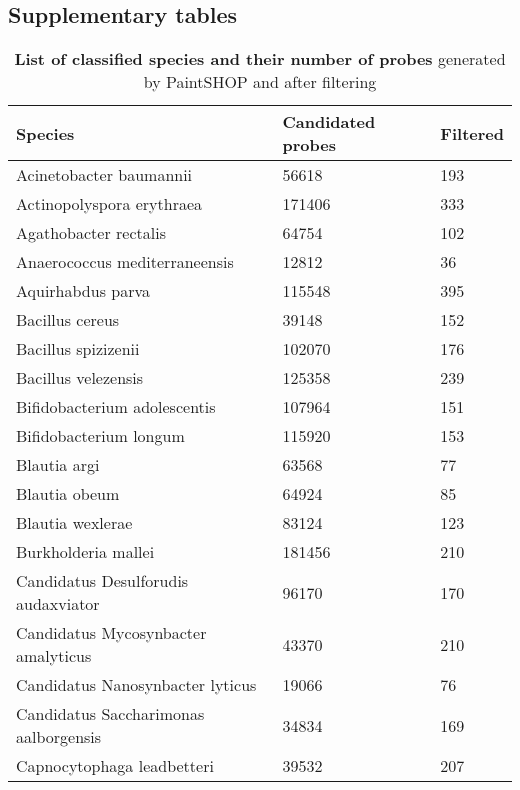 \documentclass[10pt,letterpaper]{article}
\newcommand{\beginsupplement}{%
        \setcounter{table}{0}
        \renewcommand{\thetable}{S\arabic{table}}%
        \setcounter{figure}{0}
        \renewcommand{\thefigure}{S\arabic{figure}}%
     }
\begin{document}
\subsection*{Supplementary tables}
\beginsupplement{
\begin{longtable}
{| p{} | p{} | p{} |} 
\caption{\textbf{List of classified species and their number of probes} generated by PaintSHOP and after filtering} %
\label{tableS1}
\hline
\textbf{Species}                               & \textbf{Candidated probes}      & \textbf{Filtered}   \\ \hline
Acinetobacter baumannii               & 56618  & 193 \\ \hline
Actinopolyspora erythraea             & 171406 & 333 \\ \hline
Agathobacter rectalis                 & 64754  & 102 \\ \hline
Anaerococcus mediterraneensis         & 12812  & 36  \\ \hline
Aquirhabdus parva                     & 115548 & 395 \\ \hline
Bacillus cereus                       & 39148  & 152 \\ \hline
Bacillus spizizenii                   & 102070 & 176 \\ \hline
Bacillus velezensis                   & 125358 & 239 \\ \hline
Bifidobacterium adolescentis          & 107964 & 151 \\ \hline
Bifidobacterium longum                & 115920 & 153 \\ \hline
Blautia argi                          & 63568  & 77  \\ \hline
Blautia obeum                         & 64924  & 85  \\ \hline
Blautia wexlerae                      & 83124  & 123 \\ \hline
Burkholderia mallei                   & 181456 & 210 \\ \hline
Candidatus Desulforudis audaxviator   & 96170  & 170 \\ \hline
Candidatus Mycosynbacter amalyticus   & 43370  & 210 \\ \hline
Candidatus Nanosynbacter lyticus      & 19066  & 76  \\ \hline
Candidatus Saccharimonas aalborgensis & 34834  & 169 \\ \hline
Capnocytophaga leadbetteri            & 39532  & 207 \\ \hline

\end{longtable}}
\end{document}
